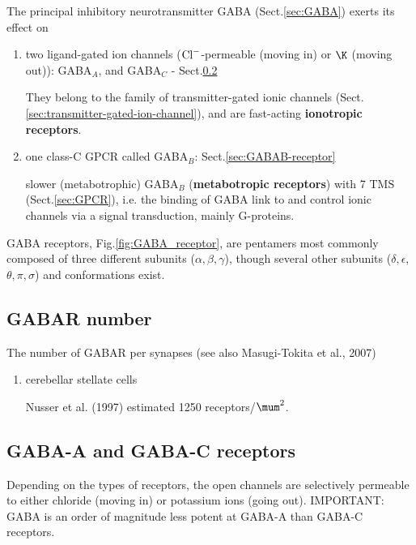 The principal inhibitory neurotransmitter GABA (Sect.\ref{sec:GABA}) exerts its
effect on
\begin{enumerate}
  \item two ligand-gated ion channels (${\text{Cl}^{-}}$-permeable (moving in) or $\K$
  (moving out)):   GABA$_A$, and GABA$_C$ - Sect.\ref{sec:GABAA-receptor-GABAC-receptor}
   
  
They belong to the family of transmitter-gated ionic channels
(Sect.\ref{sec:transmitter-gated-ion-channel}),
and are fast-acting {\bf ionotropic receptors}.
 
  \item one class-C GPCR called GABA$_B$: Sect.\ref{sec:GABAB-receptor}
  
  
slower (metabotrophic) GABA$_B$ ({\bf metabotropic receptors}) with 7 TMS
(Sect.\ref{sec:GPCR}), i.e. the binding of GABA link to and control ionic
channels via a signal transduction, mainly G-proteins.
   
\end{enumerate}

GABA receptors, Fig.\ref{fig:GABA_receptor}, are pentamers most commonly
composed of three different subunits ($\alpha, \beta, \gamma$), though several
other subunits ($\delta, \epsilon$, $\theta, \pi, \sigma$) and conformations
exist.

\subsection{GABAR number}
\label{sec:GABAR-count}

The number of GABAR per synapses (see also Masugi-Tokita et al., 2007)
\begin{enumerate}
  \item cerebellar stellate cells
  
  Nusser et al. (1997) estimated 1250 receptors/$\mum^2$.
  
\end{enumerate}

\subsection{GABA-A and GABA-C receptors}
\label{sec:GABAA-receptor-GABAC-receptor}

Depending on the types of receptors, the open channels are selectively permeable
to either chloride (moving in) or potassium ions (going out). IMPORTANT: GABA is
an order of magnitude less potent at GABA-A  than GABA-C receptors.

